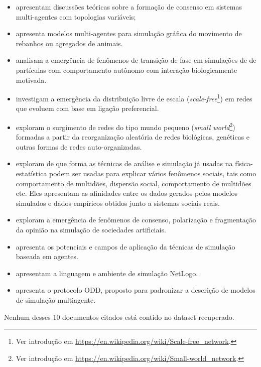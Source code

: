 \begin{itemize}
    \item  \cite{olfati-saber_consensus_2004} apresentam discussões teóricas sobre a formação de consenso em sistemas multi-agentes com topologias variáveis;
    \item  \cite{reynolds_flocks_1987} apresenta modelos multi-agentes para simulação gráfica do movimento de rebanhos ou agregados de animais.
    \item \cite{vicsek_novel_1995} analisam a emergência de fenômenos de transição de fase em simulações de de partículas com comportamento autônomo com interação biologicamente motivada.
    \item \cite{barabasi_emergence_1999} investigam a emergência da distribuição livre de escala (\textit{scale-free}\footnote{Ver introdução em \url{https://en.wikipedia.org/wiki/Scale-free_network}.}) em redes que evoluem com base em ligação preferencial.
    \item \cite{watts_collective_1998} exploram o surgimento de redes do tipo mundo pequeno (\textit{small world}\footnote{Ver introdução em \url{https://en.wikipedia.org/wiki/Small-world_network}.}) formadas a partir da reorganização aleatória de redes biológicas, genéticas e outras formas de redes auto-organizadas.
    \item \cite{castellano_statistical_2009} exploram de que forma as técnicas de análise e simulação já usadas na física-estatística podem ser usadas para explicar vários fenômenos sociais, tais como comportamento de multidões, dispersão social, comportamento de multidões etc. Eles apresentam as afinidades entre os dados gerados pelos modelos simulados e dados empíricos obtidos junto a sistemas sociais reais. 
    \item \cite{hegselmann_opinion_2002} exploram a emergência de fenômenos de consenso, polarização e fragmentação da opinião na simulação de sociedades artificiais.
    \item \cite{bonabeau_agent-based_2002} apresenta os potenciais e campos de aplicação da técnicas de simulação baseada em agentes.
    \item \cite{wilensky_netlogo_1999} apresentam a linguagem e ambiente de simulação NetLogo.
    \item \cite{grimm_standard_2006} apresenta o protocolo ODD, proposto para padronizar a descrição de modelos de simulação multiagente.
\end{itemize}

Nenhum desses 10 documentos citados está contido no dataset recuperado.

